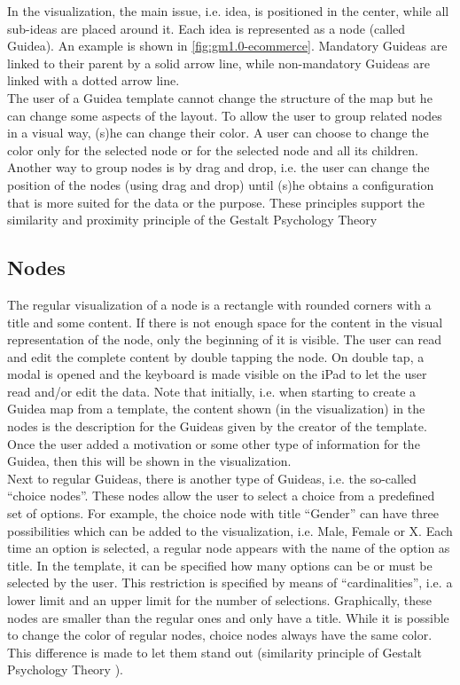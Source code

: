 In the visualization, the main issue, i.e. idea, is positioned in the center, while all sub-ideas are placed around it. Each idea is represented as a node (called Guidea). An example is shown in \autoref{fig:gm1.0-ecommerce}. Mandatory Guideas are linked to their parent by a solid arrow line, while non-mandatory Guideas are linked with a dotted arrow line.\\

The user of a Guidea template cannot change the structure of the map but he can change some aspects of the layout. To allow the user to group related nodes in a visual way, (s)he can change their color. A user can choose to change the color only for the selected node or for the selected node and all its children. Another way to group nodes is by drag and drop, i.e. the user can change the position of the nodes (using drag and drop) until (s)he obtains a configuration that is more suited for the data or the purpose. These principles support the similarity and proximity principle of the Gestalt Psychology Theory \citep{koffka2013principles}

\subsection{Nodes}\label{sec:nodes}
The regular visualization of a node is a rectangle with rounded corners with a title and some content. If there is not enough space for the content in the visual representation of the node, only the beginning of it is visible. The user can read and edit the complete content by double tapping the node. On double tap, a modal is opened and the keyboard is made visible on the iPad to let the user read and/or edit the data. Note that initially, i.e. when starting to create a Guidea map from a template, the content shown (in the visualization) in the nodes is the description for the Guideas given by the creator of the template. Once the user added a motivation or some other type of information for the Guidea, then this will be shown in the visualization.\\

Next to regular Guideas, there is another type of Guideas, i.e. the so-called ``choice nodes''. These nodes allow the user to select a choice from a predefined set of options. For example, the choice node with title ``Gender'' can have three possibilities which can be added to the visualization, i.e. Male, Female or X. Each time an option is selected, a regular node appears with the name of the option as title. In the template, it can be specified how many options can be or must be selected by the user. This restriction is specified by means of ``cardinalities'', i.e. a lower limit and an upper limit for the number of selections. Graphically, these nodes are smaller than the regular ones and only have a title. While it is possible to change the color of regular nodes, choice nodes always have the same color. This difference is made to let them stand out (similarity principle of Gestalt Psychology Theory \citep{koffka2013principles}).\\

